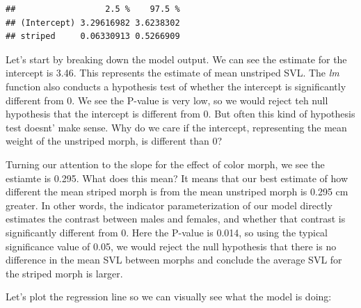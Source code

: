 \documentclass[
]{book}
\begin{document}
\begin{verbatim}
##                  2.5 %    97.5 %
## (Intercept) 3.29616982 3.6238302
## striped     0.06330913 0.5266909
\end{verbatim}

Let's start by breaking down the model output. We can see the estimate for the intercept is 3.46. This represents the estimate of mean unstriped SVL. The \emph{lm} function also conducts a hypothesis test of whether the intercept is significantly different from 0. We see the P-value is very low, so we would reject teh null hypothesis that the intercept is different from 0. But often this kind of hypothesis test doesnt' make sense. Why do we care if the intercept, representing the mean weight of the unstriped morph, is different than 0?

Turning our attention to the slope for the effect of color morph, we see the estiamte is 0.295. What does this mean? It means that our best estimate of how different the mean striped morph is from the mean unstriped morph is 0.295 cm greater. In other words, the indicator parameterization of our model directly estimates the contrast between males and females, and whether that contrast is significantly different from 0. Here the P-value is 0.014, so using the typical significance value of 0.05, we would reject the null hypothesis that there is no difference in the mean SVL between morphs and conclude the average SVL for the striped morph is larger.

Let's plot the regression line so we can visually see what the model is doing:
\end{document}
